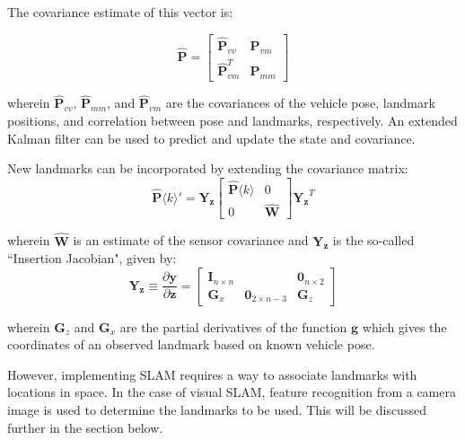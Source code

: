 \documentclass[twocolumn]{article}
\begin{document}
The covariance estimate of this vector is:

\begin{equation*}
    \hat{\mathbf{P}} = \begin{bmatrix}
        \hat{\mathbf{P}}_{vv} & \hat{\mathbf{P}}_{vm} \\
        \hat{\mathbf{P}}_{vm}^T & \hat{\mathbf{P}}_{mm}
    \end{bmatrix}
\end{equation*}

wherein $\hat{\mathbf{P}}_{vv}$, $ \hat{\mathbf{P}}_{mm}$, and $\hat{\mathbf{P}}_{vm}$ are the covariances of the vehicle pose, landmark positions, and correlation between pose and landmarks, respectively. An extended Kalman filter can be used to predict and update the state and covariance.

New landmarks can be incorporated by extending the covariance matrix:
\begin{equation*}
    \hat{\mathbf{P}}\langle k \rangle ' = \mathbf{Y_z}\begin{bmatrix}
        \hat{\mathbf{P}} \langle k \rangle & 0\\
        0 & \hat{\mathbf{W}}
    \end{bmatrix} \mathbf{Y_z}^T
\end{equation*}

wherein $\hat{\mathbf{W}}$ is an estimate of the sensor covariance and $\mathbf{Y_z}$ is the so-called ``Insertion Jacobian", given by: \begin{equation*}
    \mathbf{Y_z} \equiv \frac{\partial \mathbf{y}}{\partial \mathbf{z}} = \begin{bmatrix}
        \mathbf{I}_{n \times n} & & \mathbf{0}_{n\times 2} \\
        \mathbf{G}_x & \mathbf{0}_{2\times n-3} & \mathbf{G}_z
    \end{bmatrix}
\end{equation*}

wherein $\mathbf{G}_z$ and $\mathbf{G}_x$ are the partial derivatives of the function $\mathbf{g}$ which gives the coordinates of an observed landmark based on known vehicle pose.

However, implementing SLAM requires a way to associate landmarks with locations in space. In the case of visual SLAM, feature recognition from a camera image is used to determine the landmarks to be used. This will be discussed further in the section below.

\end{document}
